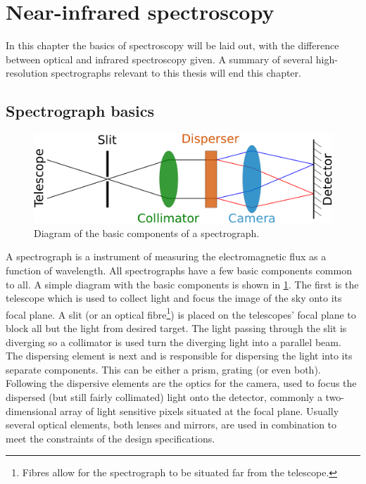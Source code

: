 
\section{Near-infrared spectroscopy}

In this chapter  the basics of spectroscopy will be laid out, with the difference between optical and infrared spectroscopy given.
A summary of several high-resolution \nir{} spectrographs relevant to this thesis will end this chapter. 

\subsection{Spectrograph basics}
\begin{figure}
    \centering
    \includegraphics[width=0.7\linewidth]{figures/spectroscopy/spectrograph_elements}
    \caption{Diagram of the basic components of a spectrograph.}
    \label{fig:spectrographelements}
\end{figure}
A spectrograph is a instrument of measuring the electromagnetic flux as a function of wavelength. All spectrographs have a few basic components common to all. A simple diagram with the basic components is shown in \cref{fig:spectrographelements}. The first is the telescope which is used to collect light and focus the image of the sky onto its focal plane. A slit (or an optical fibre\footnote{Fibres allow for the spectrograph to be situated far from the telescope.}) is placed on the telescopes' focal plane to block all but the light from desired target. The light passing through the slit is diverging so a collimator is used turn the diverging light into a parallel beam. The dispersing element is next and is responsible for dispersing the light into its separate components. This can be either a prism, grating (or even both). Following the dispersive elements are the optics for the camera, used to focus the dispersed (but still fairly collimated) light onto the detector, commonly a two-dimensional array of light sensitive pixels situated at the focal plane. Usually several optical elements, both lenses and mirrors, are used in combination to meet the constraints of the design specifications. 

